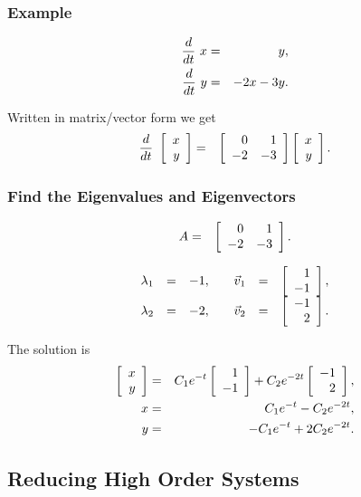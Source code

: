\begin{frame}
  \frametitle{Example}
  
  \begin{eqnarray*}
    \deriv{~}{t} x & = &  y, \\
    \deriv{~}{t} y & = & -2 x -3y.
  \end{eqnarray*}

  {
    Written in matrix/vector form we get
    \begin{eqnarray*}
      \deriv{~}{t} \vecTwo{x}{y} & = & 
      \arrayTwo{0}{1}{-2}{-3} \vecTwo{x}{y}.
    \end{eqnarray*}
  }
  
\end{frame}

\begin{frame}
  \frametitle{Find the Eigenvalues and Eigenvectors}

  \begin{eqnarray*}
    A & = & \arrayTwo{0}{1}{-2}{-3}.
  \end{eqnarray*}

  {
    \begin{eqnarray*}
      \begin{array}{rcl@{\hspace{2em}}rcl}
          \lambda_1 & = & -1, & \vec{v}_1 & = & \vecTwo{1}{-1}, \\
          \lambda_2 & = & -2, & \vec{v}_2 & = & \vecTwo{-1}{2}.
        \end{array}
    \end{eqnarray*}
  }

  {
    The solution is
    \begin{eqnarray*}
       \vecTwo{x}{y} & = & C_1 e^{-t} \vecTwo{1}{-1}  + C_2 e^{-2t} \vecTwo{-1}{2}, \\
      x & = & C_1 e^{-t} - C_2 e^{-2t}, \\
      y & = & -C_1 e^{-t} + 2 C_2 e^{-2t}.
    \end{eqnarray*}
  }

\end{frame}


\subsection{Reducing High Order Systems}

